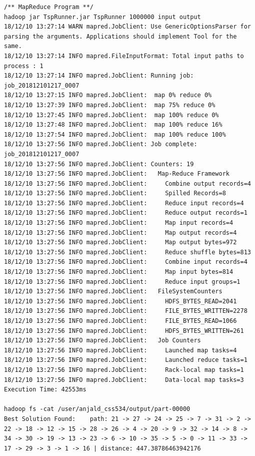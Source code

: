 \documentclass{article}
\begin{document}
\begin{lstlisting}
/** MapReduce Program **/
hadoop jar TspRunner.jar TspRunner 1000000 input output
18/12/10 13:27:14 WARN mapred.JobClient: Use GenericOptionsParser for parsing the arguments. Applications should implement Tool for the same.
18/12/10 13:27:14 INFO mapred.FileInputFormat: Total input paths to process : 1
18/12/10 13:27:14 INFO mapred.JobClient: Running job: job_201812101217_0007
18/12/10 13:27:15 INFO mapred.JobClient:  map 0% reduce 0%
18/12/10 13:27:39 INFO mapred.JobClient:  map 75% reduce 0%
18/12/10 13:27:45 INFO mapred.JobClient:  map 100% reduce 0%
18/12/10 13:27:48 INFO mapred.JobClient:  map 100% reduce 16%
18/12/10 13:27:54 INFO mapred.JobClient:  map 100% reduce 100%
18/12/10 13:27:56 INFO mapred.JobClient: Job complete: job_201812101217_0007
18/12/10 13:27:56 INFO mapred.JobClient: Counters: 19
18/12/10 13:27:56 INFO mapred.JobClient:   Map-Reduce Framework
18/12/10 13:27:56 INFO mapred.JobClient:     Combine output records=4
18/12/10 13:27:56 INFO mapred.JobClient:     Spilled Records=8
18/12/10 13:27:56 INFO mapred.JobClient:     Reduce input records=4
18/12/10 13:27:56 INFO mapred.JobClient:     Reduce output records=1
18/12/10 13:27:56 INFO mapred.JobClient:     Map input records=4
18/12/10 13:27:56 INFO mapred.JobClient:     Map output records=4
18/12/10 13:27:56 INFO mapred.JobClient:     Map output bytes=972
18/12/10 13:27:56 INFO mapred.JobClient:     Reduce shuffle bytes=813
18/12/10 13:27:56 INFO mapred.JobClient:     Combine input records=4
18/12/10 13:27:56 INFO mapred.JobClient:     Map input bytes=814
18/12/10 13:27:56 INFO mapred.JobClient:     Reduce input groups=1
18/12/10 13:27:56 INFO mapred.JobClient:   FileSystemCounters
18/12/10 13:27:56 INFO mapred.JobClient:     HDFS_BYTES_READ=2041
18/12/10 13:27:56 INFO mapred.JobClient:     FILE_BYTES_WRITTEN=2278
18/12/10 13:27:56 INFO mapred.JobClient:     FILE_BYTES_READ=1066
18/12/10 13:27:56 INFO mapred.JobClient:     HDFS_BYTES_WRITTEN=261
18/12/10 13:27:56 INFO mapred.JobClient:   Job Counters
18/12/10 13:27:56 INFO mapred.JobClient:     Launched map tasks=4
18/12/10 13:27:56 INFO mapred.JobClient:     Launched reduce tasks=1
18/12/10 13:27:56 INFO mapred.JobClient:     Rack-local map tasks=1
18/12/10 13:27:56 INFO mapred.JobClient:     Data-local map tasks=3
Execution Time: 42553ms

hadoop fs -cat /user/anjald_css534/output/part-00000
Best Solution Found:    path: 21 -> 27 -> 24 -> 25 -> 7 -> 31 -> 2 -> 22 -> 18 -> 12 -> 15 -> 28 -> 26 -> 4 -> 20 -> 9 -> 32 -> 14 -> 8 -> 34 -> 30 -> 19 -> 13 -> 23 -> 6 -> 10 -> 35 -> 5 -> 0 -> 11 -> 33 -> 17 -> 29 -> 3 -> 1 -> 16 | distance: 447.38786463942176


\end{lstlisting}
\end{document}

